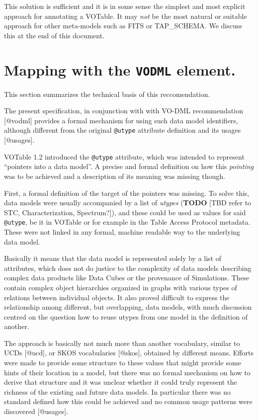 \documentclass[11pt,a4paper]{ivoa}
\begin{document}
This solution is sufficient and it is in some sense the simplest and
most explicit approach for annotating a VOTable. It may \emph{not} be
the most natural or suitable approach for other meta-models such as FITS
or TAP\_SCHEMA. We discuss this at the end of this document.

\section{Mapping with the \texttt{VODML}
element.}\label{mapping-with-the-vodml-element.}

This section summarizes the technical basis of this reccomendation.

The present specification, in conjunction with with VO-DML
recommendation {[}@vodml{]} provides a formal mechanism for using such
data model identifiers, although different from the original
\texttt{@utype} attribute definition and its usages {[}@usages{]}.

VOTable 1.2 introduced the \texttt{@utype} attribute, which was intended
to represent ``pointers into a data model''. A precise and formal
definition on how this \emph{pointing} was to be achieved and a
description of its meaning was missing though.

First, a formal definition of the target of the pointers was missing. To
solve this, data models were usually accompanied by a list of
\emph{utypes} (\textbf{TODO} {[}TBD refer to STC, Characterization,
Spectrum?{]}), and these could be used as values for said
\texttt{@utype}, be it in VOTable or for example in the Table Access
Protocol metadata. These were not linked in any formal, machine readable
way to the underlying data model.

Basically it means that the data model is represented solely by a list
of attributes, which does not do justice to the complexity of data
models describing complex data products like Data Cubes or the
provenance of Simulations. These contain complex object hierarchies
organized in graphs with various types of relations between individual
objects. It also proved difficult to express the relationship among
different, but overlapping, data models, with much discussion centred on
the question how to reuse utypes from one model in the definition of
another.

The approach is basically not much more than another vocabulary, similar
to UCDs {[}@ucd{]}, or SKOS vocabularies {[}@skos{]}, obtained by
different means. Efforts were made to provide some structure to these
values that might provide some hints of their location in a model, but
there was no formal mechanism on how to derive that structure and it was
unclear whether it could truly represent the richness of the existing
and future data models. In particular there was no standard defined how
this could be achieved and no common usage patterns were discovered
{[}@usages{]}.
\end{document}
